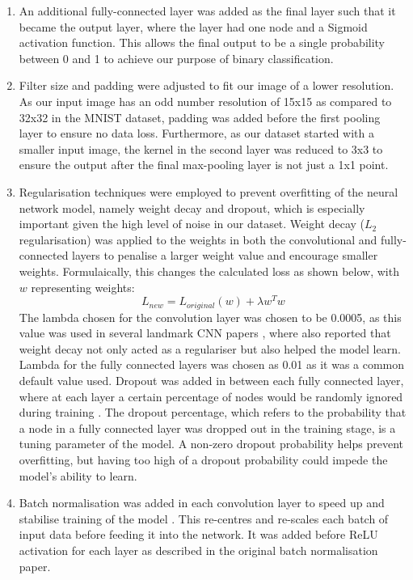 \documentclass[a4paper,11pt]{report}
\begin{document}
\begin{enumerate}
    \item An additional fully-connected layer was added as the final layer such that it became the output layer, where the layer had one node and a Sigmoid activation function. This allows the final output to be a single probability between 0 and 1 to achieve our purpose of binary classification.
    \item Filter size and padding were adjusted to fit our image of a lower resolution. As our input image has an odd number resolution of 15x15 as compared to 32x32 in the MNIST dataset, padding was added before the first pooling layer to ensure no data loss. Furthermore, as our dataset started with a smaller input image, the kernel in the second layer was reduced to 3x3 to ensure the output after the final max-pooling layer is not just a 1x1 point. 
    \item  Regularisation techniques were employed to prevent overfitting of the neural network model, namely weight decay and dropout, which is especially important given the high level of noise in our dataset. Weight decay ($L_2$ regularisation) was applied to the weights in both the convolutional and fully-connected layers to penalise a larger weight value and encourage smaller weights. Formulaically, this changes the calculated loss as shown below, with $w$ representing weights:
    \begin{equation}
    L_{new} = L_{original}(w) + \lambda w^T w 
    \end{equation}
    The lambda chosen for the convolution layer was chosen to be 0.0005, as this value was used in several landmark CNN papers \citep{krizhevsky2012imagenet} \citep{simonyan2014very}, where \citep{krizhevsky2012imagenet} also reported that weight decay not only acted as a regulariser but also helped the model learn. Lambda for the fully connected layers was chosen as 0.01 as it was a common default value used. Dropout was added in between each fully connected layer, where at each layer a certain percentage of nodes would be randomly ignored during training \citep{srivastava2014dropout}. The dropout percentage, which refers to the probability that a node in a fully connected layer was dropped out in the training stage, is a tuning parameter of the model. A non-zero dropout probability helps prevent overfitting, but having too high of a dropout probability could impede the model's ability to learn. 
    \item Batch normalisation was added in each convolution layer to speed up and stabilise training of the model \citep{ioffe2015batch}. This re-centres and re-scales each batch of input data before feeding it into the network. It was added before ReLU activation for each layer as described in the original batch normalisation paper.

\end{enumerate}
\end{document}
